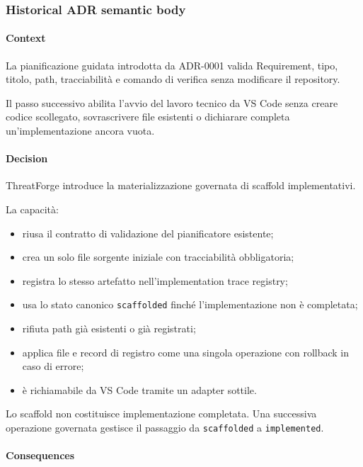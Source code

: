 \documentclass[
  10pt,
]{article}
\providecommand{\tightlist}{%
  \setlength{\itemsep}{0pt}\setlength{\parskip}{0pt}}
\begin{document}
\subsubsection{Historical ADR semantic
body}\label{historical-adr-semantic-body-11}

\paragraph{Context}\label{context-22}

La pianificazione guidata introdotta da ADR-0001 valida Requirement,
tipo, titolo, path, tracciabilità e comando di verifica senza modificare
il repository.

Il passo successivo abilita l'avvio del lavoro tecnico da VS Code senza
creare codice scollegato, sovrascrivere file esistenti o dichiarare
completa un'implementazione ancora vuota.

\paragraph{Decision}\label{decision-22}

ThreatForge introduce la materializzazione governata di scaffold
implementativi.

La capacità:

\begin{itemize}
\tightlist
\item
  riusa il contratto di validazione del pianificatore esistente;
\item
  crea un solo file sorgente iniziale con tracciabilità obbligatoria;
\item
  registra lo stesso artefatto nell'implementation trace registry;
\item
  usa lo stato canonico \texttt{scaffolded} finché l'implementazione non
  è completata;
\item
  rifiuta path già esistenti o già registrati;
\item
  applica file e record di registro come una singola operazione con
  rollback in caso di errore;
\item
  è richiamabile da VS Code tramite un adapter sottile.
\end{itemize}

Lo scaffold non costituisce implementazione completata. Una successiva
operazione governata gestisce il passaggio da \texttt{scaffolded} a
\texttt{implemented}.

\paragraph{Consequences}\label{consequences-22}
\end{document}
